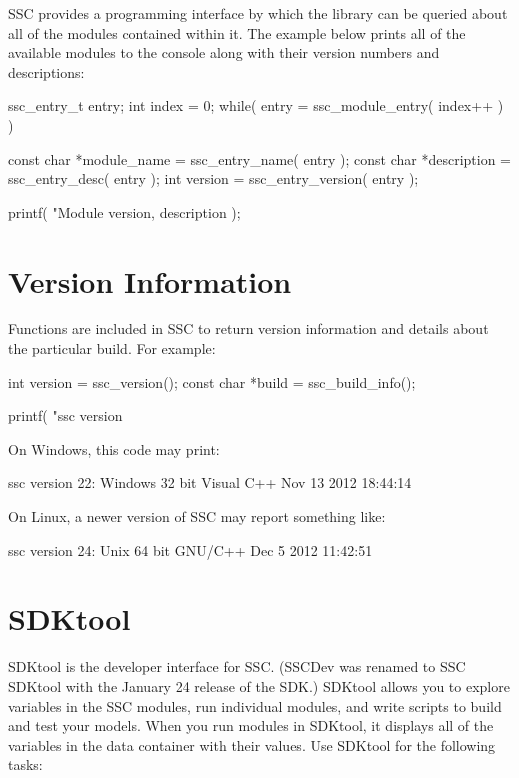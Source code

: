 \documentclass{scrartcl} %
\begin{document}
SSC provides a programming interface by which the library can be queried about all of the modules contained within it.  The example below prints all of the available modules to the console along with their version numbers and descriptions:

\begin{verbatimtab}[4]
ssc_entry_t entry;
int index = 0;
while( entry = ssc_module_entry( index++ ) )
{
	const char *module_name = ssc_entry_name( entry );
	const char *description = ssc_entry_desc( entry );
	int version = ssc_entry_version( entry );

	printf( "Module %
            version, description );
}
\end{verbatimtab}

\section{Version Information}

Functions are included in SSC to return version information and details about the particular build.  For example:

\begin{verbatimtab}[4]
int version = ssc_version();
const char *build = ssc_build_info();

printf( "ssc version %
\end{verbatimtab}

On Windows, this code may print:

\begin{verbatimtab}[4]
	ssc version 22: Windows 32 bit Visual C++ Nov 13 2012 18:44:14
\end{verbatimtab}

On Linux, a newer version of SSC may report something like:
\begin{verbatimtab}[4]
	ssc version 24: Unix 64 bit GNU/C++ Dec  5 2012 11:42:51
\end{verbatimtab}

\section{SDKtool}
\label{sec_sdktool}

SDKtool is the developer interface for SSC.  (SSCDev was renamed to SSC SDKtool with the January 24 release of the SDK.) SDKtool allows you to explore variables in the SSC modules, run individual modules, and write scripts to build and test your models. When you run modules in SDKtool, it displays all of the variables in the data container with their values. Use SDKtool for the following tasks:
\end{document}
